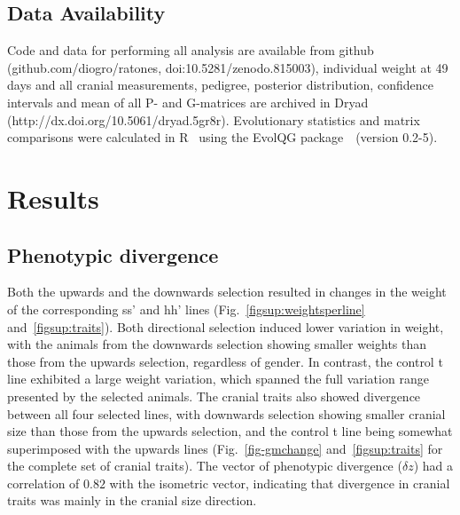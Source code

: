 \begin{refsection}
\subsection{Data Availability}

Code and data for performing all analysis are available from github
(github.com/diogro/ratones, doi:10.5281/zenodo.815003), individual
weight at 49 days and all cranial measurements, pedigree, posterior
distribution, confidence intervals and mean of all P- and G-matrices are
archived in Dryad (http://dx.doi.org/10.5061/dryad.5gr8r). Evolutionary
statistics and matrix comparisons were calculated in R~\parencite{R2005}
using the EvolQG package~\parencite{Melo2015-kf}~(version 0.2-5).

\section{Results}

\subsection{Phenotypic divergence}

Both the upwards and the downwards selection resulted in changes
in the weight of the corresponding s\textbar{}s' and h\textbar{}h' lines
(Fig.~\ref{figsup:weightsperline} and~\ref{figsup:traits}). 
Both directional selection induced lower variation in
weight, with the animals from the downwards selection showing smaller
weights than those from the upwards selection, regardless of gender. In
contrast, the control t line exhibited a large weight variation, which
spanned the full variation range presented by the selected animals. The
cranial traits also showed divergence between all four selected lines,
with downwards selection showing smaller cranial size than those from
the upwards selection, and the control t line being somewhat
superimposed with the upwards lines (Fig.~\ref{fig-gmchange} and~\ref{figsup:traits}
for the complete set of cranial traits). The vector of phenotypic
divergence (\(\delta z\)) had a correlation of \(0.82\) with the
isometric vector, indicating that divergence in cranial traits was
mainly in the cranial size direction.


\end{refsection}
